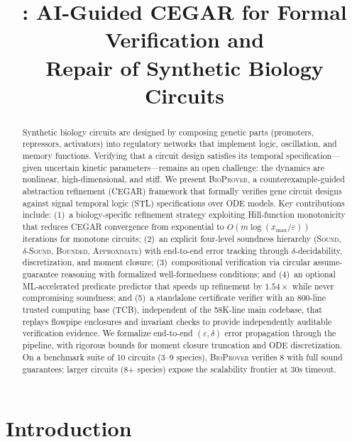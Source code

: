 \documentclass[11pt]{article}
\title{\bioprover{}: AI-Guided CEGAR for Formal Verification and\\
Repair of Synthetic Biology Circuits}
\date{}
\newcommand{\bioprover}{\textsc{BioProver}}
\newcommand{\cegar}{\textsc{CEGAR}}
\newcommand{\stl}{\textsc{STL}}
\begin{document}
\maketitle

\begin{abstract}
Synthetic biology circuits are designed by composing genetic parts
(promoters, repressors, activators) into regulatory networks that
implement logic, oscillation, and memory functions. Verifying that a
circuit design satisfies its temporal specification---given uncertain
kinetic parameters---remains an open challenge: the dynamics are
nonlinear, high-dimensional, and stiff. We present \bioprover{}, a
counterexample-guided abstraction refinement (\cegar{}) framework
that formally verifies gene circuit designs against
signal temporal logic (\stl{}) specifications over ODE models. Key
contributions include: (1)~a biology-specific refinement strategy
exploiting Hill-function monotonicity that reduces \cegar{}
convergence from exponential to $O(m \log(x_{\max}/\varepsilon))$
iterations for monotone circuits; (2)~an explicit four-level
soundness hierarchy (\textsc{Sound}, \textsc{$\delta$-Sound},
\textsc{Bounded}, \textsc{Approximate}) with end-to-end error
tracking through $\delta$-decidability, discretization, and moment
closure; (3)~compositional verification via circular
assume-guarantee reasoning with formalized well-formedness
conditions; and (4)~an optional ML-accelerated predicate predictor
that speeds up refinement by $1.54\times$ while never compromising
soundness; and (5)~a standalone certificate verifier with an 800-line
trusted computing base (TCB), independent of the 58K-line main
codebase, that replays flowpipe enclosures and invariant checks to
provide independently auditable verification evidence. We formalize
end-to-end $(\varepsilon,\delta)$ error propagation through the
pipeline, with rigorous bounds for moment closure truncation and ODE
discretization. On a benchmark suite of 10 circuits (3--9 species),
\bioprover{} verifies 8 with full sound guarantees; larger circuits
(8+ species) expose the scalability frontier at 30s timeout.
\end{abstract}

\section{Introduction}
\label{sec:intro}
\end{document}
